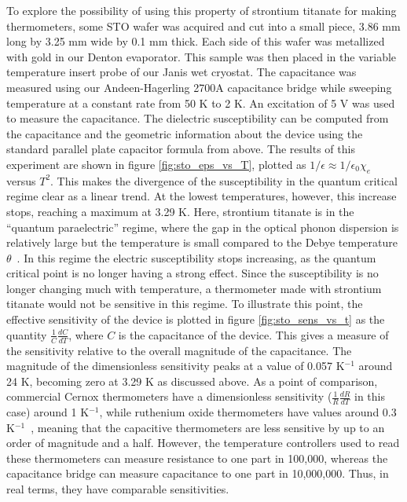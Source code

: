 \documentclass{thesis-umich}
\begin{document}
 To explore the possibility of using this property of strontium titanate for making thermometers, some STO wafer was acquired and cut into a small piece, 3.86 mm long by 3.25 mm wide by 0.1 mm thick. Each side of this wafer was metallized with gold in our Denton evaporator. This sample was then placed in the variable temperature insert probe of our Janis wet cryostat. The capacitance was measured using our Andeen-Hagerling 2700A capacitance bridge while sweeping temperature at a constant rate from 50 K to 2 K. An excitation of 5 V was used to measure the capacitance. The dielectric susceptibility can be computed from the capacitance and the geometric information about the device using the standard parallel plate capacitor formula from above. The results of this experiment are shown in figure \ref{fig:sto_eps_vs_T}, plotted as $1/\epsilon \approx 1/\epsilon_0 \chi_e$ versus $T^2$. This makes the divergence of the susceptibility in the quantum critical regime clear as a linear trend. At the lowest temperatures, however, this increase stops, reaching a maximum at 3.29 K. Here, strontium titanate is in the ``quantum paraelectric'' regime, where the gap in the optical phonon dispersion is relatively large but the temperature is small compared to the Debye temperature $\theta$~\cite{RowleyThesis}. In this regime the electric susceptibility stops increasing, as the quantum critical point is no longer having a strong effect. Since the susceptibility is no longer changing much with temperature, a thermometer made with strontium titanate would not be sensitive in this regime. To illustrate this point, the effective sensitivity of the device is plotted in figure \ref{fig:sto_sens_vs_t} as the quantity $\frac{1}{C}\frac{dC}{dT}$, where $C$ is the capacitance of the device. This gives a measure of the sensitivity relative to the overall magnitude of the capacitance. The magnitude of the dimensionless sensitivity peaks at a value of 0.057 K$^{-1}$ around 24 K, becoming zero at 3.29 K as discussed above. As a point of comparison, commercial Cernox thermometers have a dimensionless sensitivity ($\frac{1}{R}\frac{dR}{dT}$ in this case) around 1 K$^{-1}$, while ruthenium oxide thermometers have values around 0.3 K$^{-1}$~\cite{LakeshoreCorp}, meaning that the capacitive thermometers are less sensitive by up to an order of magnitude and a half. However, the temperature controllers used to read these thermometers can measure resistance to one part in 100,000, whereas the capacitance bridge can measure capacitance to one part in 10,000,000. Thus, in real terms, they have comparable sensitivities. 
\end{document}
